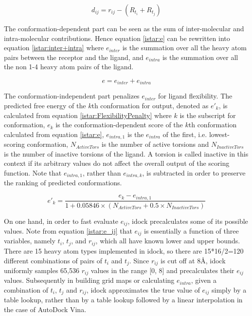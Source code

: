 \begin{equation}
\label{istar:d_ij}
d_{ij} = r_{ij} - (R_{t_i} + R_{t_j})
\end{equation}

The conformation-dependent part can be seen as the sum of inter-molecular and intra-molecular contributions. Hence equation \eqref{istar:e} can be rewritten into equation \eqref{istar:inter+intra} where $e_{inter}$ is the summation over all the heavy atom pairs between the receptor and the ligand, and $e_{intra}$ is the summation over all the non 1-4 heavy atom pairs of the ligand.

\begin{equation}
\label{istar:inter+intra}
e = e_{inter} + e_{intra}
\end{equation}

The conformation-independent part penalizes $e_{inter}$ for ligand flexibility. The predicted free energy of the $k$th conformation for output, denoted as $e'_k$, is calculated from equation \eqref{istar:FlexibilityPenalty} where $k$ is the subscript for conformation, $e_k$ is the conformation-dependent score of the $k$th conformation calculated from equation \eqref{istar:e}, $e_{intra,1}$ is the $e_{intra}$ of the first, i.e. lowest-scoring conformation, $N_{ActiveTors}$ is the number of active torsions and $N_{InactiveTors}$ is the number of inactive torsions of the ligand. A torsion is called inactive in this context if its arbitrary values do not affect the overall output of the scoring function. Note that $e_{intra,1}$, rather than $e_{intra,k}$, is subtracted in order to preserve the ranking of predicted conformations.

\begin{equation}
\label{istar:FlexibilityPenalty}
e'_k = \frac{e_k - e_{intra,1}}{1 + 0.05846 \times (N_{ActiveTors} + 0.5 \times N_{InactiveTors})}
\end{equation}

On one hand, in order to fast evaluate $e_{ij}$, idock precalculates some of its possible values. Note from equation \eqref{istar:e_ij} that $e_{ij}$ is essentially a function of three variables, namely $t_i$, $t_j$, and $r_{ij}$, which all have known lower and upper bounds. There are 15 heavy atom types implemented in idock, so there are 15*16/2=120 different combinations of pairs of $t_i$ and $t_j$. Since $r_{ij}$ is cut off at 8\AA, idock uniformly samples 65,536 $r_{ij}$ values in the range [0, 8] and precalculates their $e_{ij}$ values. Subsequently in building grid maps or calculating $e_{intra}$, given a combination of $t_i$, $t_j$ and $r_{ij}$, idock approximates the true value of $e_{ij}$ simply by a table lookup, rather than by a table lookup followed by a linear interpolation in the case of AutoDock Vina.

